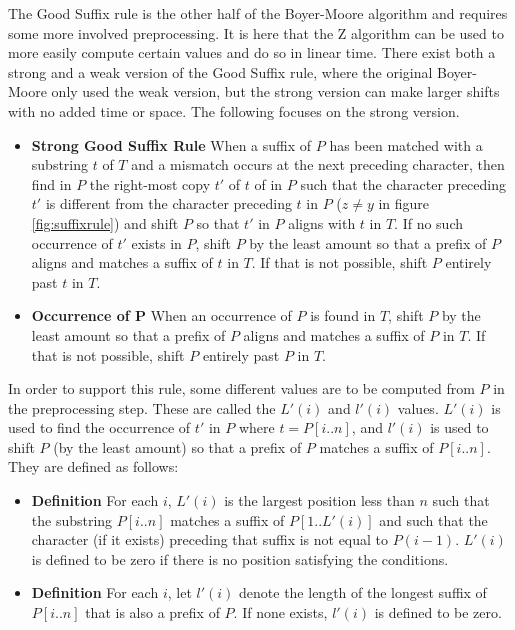 The Good Suffix rule is the other half of the Boyer-Moore algorithm and requires some more involved preprocessing. It is here that the Z algorithm can be used to more easily compute certain values and do so in linear time. There exist both a strong and a weak version of the Good Suffix rule, where the original Boyer-Moore only used the weak version\cite{Gusfield1997AlgorithmsOS}, but the strong version can make larger shifts with no added time or space. The following focuses on the strong version. 

\begin{itemize}
    \item[] \textbf{Strong Good Suffix Rule} When a suffix of $P$ has been matched with a substring $t$ of $T$ and a mismatch occurs at the next preceding character, then find in $P$ the right-most copy $t'$ of $t$ of in $P$ such that the character preceding $t'$ is different from the character preceding $t$ in $P$ ($z\neq y$ in figure \ref{fig:suffixrule}) and shift $P$ so that $t'$ in $P$ aligns with $t$ in $T$. If no such occurrence of $t'$ exists in $P$, shift $P$ by the least amount so that a prefix of $P$ aligns and matches a suffix of $t$ in $T$. If that is not possible, shift $P$ entirely past $t$ in $T$. 
    \item[] \textbf{Occurrence of P} When an occurrence of $P$ is found in $T$, shift $P$ by the least amount so that a prefix of $P$ aligns and matches a suffix of $P$ in $T$. If that is not possible, shift $P$ entirely past $P$ in $T$. 
\end{itemize}

In order to support this rule, some different values are to be computed from $P$ in the preprocessing step. These are called the $L'(i)$ and $l'(i)$ values. $L'(i)$ is used to find the occurrence of $t'$ in $P$ where $t=P[i..n]$, and $l'(i)$ is used to shift $P$ (by the least amount) so that a prefix of $P$ matches a suffix of $P[i..n]$. They are defined as follows:

\begin{itemize}
    \item[] \textbf{Definition} For each $i$, $L'(i)$ is the largest position less than $n$ such that the substring $P[i..n]$ matches a suffix of $P[1..L'(i)]$ and such that the character (if it exists) preceding that suffix is not equal to $P(i-1)$. $L'(i)$ is defined to be zero if there is no position satisfying the conditions. 
    \item[] \textbf{Definition} For each $i$, let $l'(i)$ denote the length of the longest suffix of $P[i..n]$ that is also a prefix of $P$. If none exists, $l'(i)$ is defined to be zero. 
\end{itemize}

